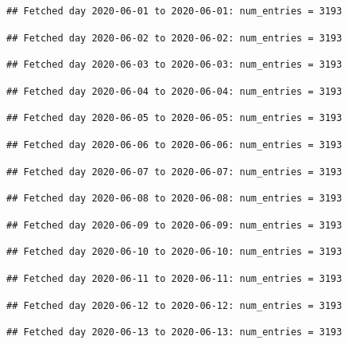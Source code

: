 \documentclass[]{article}
\begin{document}
\begin{verbatim}
## Fetched day 2020-06-01 to 2020-06-01: num_entries = 3193
\end{verbatim}

\begin{verbatim}
## Fetched day 2020-06-02 to 2020-06-02: num_entries = 3193
\end{verbatim}

\begin{verbatim}
## Fetched day 2020-06-03 to 2020-06-03: num_entries = 3193
\end{verbatim}

\begin{verbatim}
## Fetched day 2020-06-04 to 2020-06-04: num_entries = 3193
\end{verbatim}

\begin{verbatim}
## Fetched day 2020-06-05 to 2020-06-05: num_entries = 3193
\end{verbatim}

\begin{verbatim}
## Fetched day 2020-06-06 to 2020-06-06: num_entries = 3193
\end{verbatim}

\begin{verbatim}
## Fetched day 2020-06-07 to 2020-06-07: num_entries = 3193
\end{verbatim}

\begin{verbatim}
## Fetched day 2020-06-08 to 2020-06-08: num_entries = 3193
\end{verbatim}

\begin{verbatim}
## Fetched day 2020-06-09 to 2020-06-09: num_entries = 3193
\end{verbatim}

\begin{verbatim}
## Fetched day 2020-06-10 to 2020-06-10: num_entries = 3193
\end{verbatim}

\begin{verbatim}
## Fetched day 2020-06-11 to 2020-06-11: num_entries = 3193
\end{verbatim}

\begin{verbatim}
## Fetched day 2020-06-12 to 2020-06-12: num_entries = 3193
\end{verbatim}

\begin{verbatim}
## Fetched day 2020-06-13 to 2020-06-13: num_entries = 3193
\end{verbatim}
\end{document}
